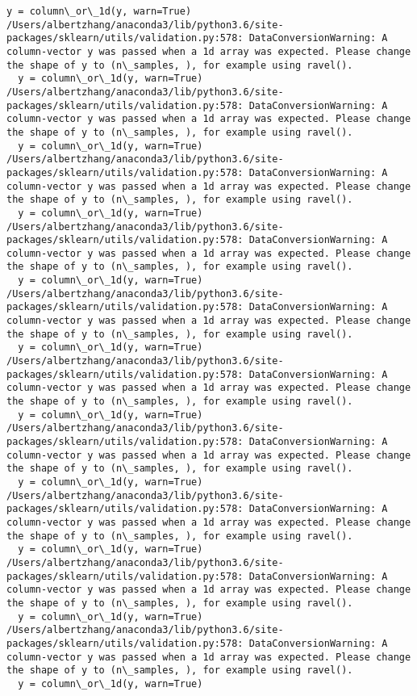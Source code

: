 \documentclass[11pt]{article}
\begin{document}
\begin{Verbatim}[commandchars=\\\{\}]
  y = column\_or\_1d(y, warn=True)
/Users/albertzhang/anaconda3/lib/python3.6/site-packages/sklearn/utils/validation.py:578: DataConversionWarning: A column-vector y was passed when a 1d array was expected. Please change the shape of y to (n\_samples, ), for example using ravel().
  y = column\_or\_1d(y, warn=True)
/Users/albertzhang/anaconda3/lib/python3.6/site-packages/sklearn/utils/validation.py:578: DataConversionWarning: A column-vector y was passed when a 1d array was expected. Please change the shape of y to (n\_samples, ), for example using ravel().
  y = column\_or\_1d(y, warn=True)
/Users/albertzhang/anaconda3/lib/python3.6/site-packages/sklearn/utils/validation.py:578: DataConversionWarning: A column-vector y was passed when a 1d array was expected. Please change the shape of y to (n\_samples, ), for example using ravel().
  y = column\_or\_1d(y, warn=True)
/Users/albertzhang/anaconda3/lib/python3.6/site-packages/sklearn/utils/validation.py:578: DataConversionWarning: A column-vector y was passed when a 1d array was expected. Please change the shape of y to (n\_samples, ), for example using ravel().
  y = column\_or\_1d(y, warn=True)
/Users/albertzhang/anaconda3/lib/python3.6/site-packages/sklearn/utils/validation.py:578: DataConversionWarning: A column-vector y was passed when a 1d array was expected. Please change the shape of y to (n\_samples, ), for example using ravel().
  y = column\_or\_1d(y, warn=True)
/Users/albertzhang/anaconda3/lib/python3.6/site-packages/sklearn/utils/validation.py:578: DataConversionWarning: A column-vector y was passed when a 1d array was expected. Please change the shape of y to (n\_samples, ), for example using ravel().
  y = column\_or\_1d(y, warn=True)
/Users/albertzhang/anaconda3/lib/python3.6/site-packages/sklearn/utils/validation.py:578: DataConversionWarning: A column-vector y was passed when a 1d array was expected. Please change the shape of y to (n\_samples, ), for example using ravel().
  y = column\_or\_1d(y, warn=True)
/Users/albertzhang/anaconda3/lib/python3.6/site-packages/sklearn/utils/validation.py:578: DataConversionWarning: A column-vector y was passed when a 1d array was expected. Please change the shape of y to (n\_samples, ), for example using ravel().
  y = column\_or\_1d(y, warn=True)
/Users/albertzhang/anaconda3/lib/python3.6/site-packages/sklearn/utils/validation.py:578: DataConversionWarning: A column-vector y was passed when a 1d array was expected. Please change the shape of y to (n\_samples, ), for example using ravel().
  y = column\_or\_1d(y, warn=True)
/Users/albertzhang/anaconda3/lib/python3.6/site-packages/sklearn/utils/validation.py:578: DataConversionWarning: A column-vector y was passed when a 1d array was expected. Please change the shape of y to (n\_samples, ), for example using ravel().
  y = column\_or\_1d(y, warn=True)

    \end{Verbatim}
\end{document}
